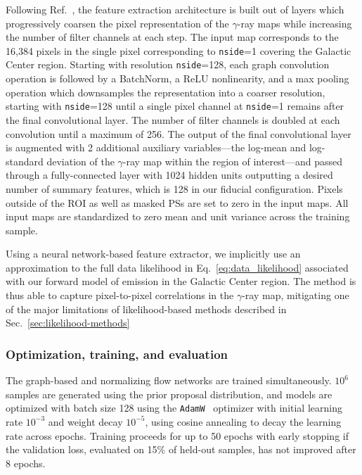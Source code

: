 \documentclass[prd,aps,10pt,nofootinbib,twocolumn,superscriptaddress,preprintnumbers,balancelastpage,longbibliography]{revtex4-1}
\begin{document}
Following Ref.~\cite{Perraudin:2018rbt}, the feature extraction architecture is built out of layers which progressively coarsen the pixel representation of the $\gamma$-ray maps while increasing the number of filter channels at each step. The input map corresponds to the 16,384 pixels in the single pixel corresponding to \texttt{nside}=1 covering the Galactic Center region. Starting with \HEALPix resolution \texttt{nside}=128, each graph convolution operation is followed by a BatchNorm, a ReLU nonlinearity, and a max pooling operation which downsamples the representation into a coarser resolution, starting with \texttt{nside}=128 until a single pixel channel at \texttt{nside}=1 remains after the final convolutional layer. The number of filter channels is doubled at each convolution until a maximum of 256. The output of the final convolutional layer is augmented with 2 additional auxiliary variables---the log-mean and log-standard deviation of the $\gamma$-ray map within the region of interest---and passed through a fully-connected layer with 1024 hidden units outputting a desired number of summary features, which is 128 in our fiducial configuration. Pixels outside of the ROI as well as masked PSs are set to zero in the input maps. All input maps are standardized to zero mean and unit variance across the training sample.

Using a neural network-based feature extractor, we implicitly use an approximation to the full data likelihood in Eq.~\eqref{eq:data_likelihood} associated with our forward model of emission in the Galactic Center region. The method is thus able to capture pixel-to-pixel correlations in the $\gamma$-ray map, mitigating one of the major limitations of likelihood-based methods described in Sec.~\ref{sec:likelihood-methods}

\subsubsection*{Optimization, training, and evaluation}

The graph-based and normalizing flow networks are trained simultaneously. $10^{6}$ samples are generated using the prior proposal distribution, and models are optimized with batch size 128 using the \texttt{AdamW}~\cite{KingmaB14,loshchilov2018decoupled} optimizer with initial learning rate $10^{-3}$ and weight decay $10^{-5}$, using cosine annealing to decay the learning rate across epochs. Training proceeds for up to 50 epochs with early stopping if the validation loss, evaluated on 15\% of held-out samples, has not improved after 8 epochs. 
\end{document}
